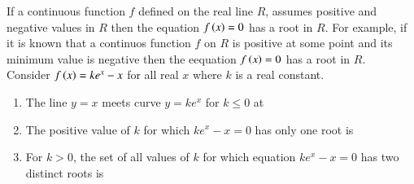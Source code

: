 \documentclass[journal,,12pt,twocolumn]{IEEEtran}
\theoremstyle{remark}
\begin{document}
 If a continuous function $f$ defined on the real line $R$, assumes positive and negative values in $R$ then the equation $f\left(x\right)=0$ has a root in $R$. For example, if it is known that a continuos function $f$ on $R$ is positive at some point and its minimum value is negative then the eequation $f\left(x\right)=0$ has a root in $R$.\\
 Consider $f\left(x\right)=ke^x-x$ for all real $x$ where $k$ is a real constant.
 \begin{enumerate}
 \item The line $y=x$ meets curve $y=ke^x$ for $k \le 0$ at
 \hfill {}\\
    \begin{enumerate}
\end{enumerate}

  



\item  The positive value of $k$ for which $ke^x-x=0$ has only one root is
\hfill {}\\
\begin{enumerate}
\end{enumerate}




\item For $k>0$, the set of all values of $k$ for which equation $ke^x-x=0$ has two distinct roots is 
\hfill {}\\
\begin{enumerate}
\end{enumerate}



\end{enumerate}
\end{document}
